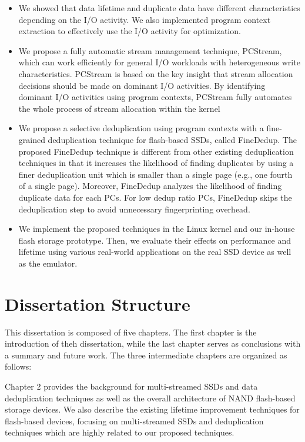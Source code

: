 \begin{itemize}
\item 
We showed that data lifetime and duplicate data have different characteristics depending on the I/O activity.
We also implemented program context extraction to effectively use the I/O activity for optimization.

\item 
We propose a fully automatic stream management
technique, PCStream, which can work efficiently for general
I/O workloads with heterogeneous write characteristics. PCStream
is based on the key insight that stream allocation decisions
should be made on dominant I/O activities. By identifying
dominant I/O activities using program contexts, PCStream
fully automates the whole process of stream allocation
within the kernel 

\item
We propose a selective deduplication using program contexts
with a fine-grained deduplication technique for flash-based SSDs, called \textsf{\small FineDedup}.
The proposed FineDedup technique is different from other existing deduplication techniques
in that it increases the likelihood of finding duplicates
by using a finer deduplication unit
which is smaller than a single page (e.g., one fourth of a single page).
Moreover, FineDedup analyzes the likelihood of finding duplicate data for each PCs.
For low dedup ratio PCs, FineDedup skips the deduplication step to avoid unnecessary 
fingerprinting overhead.

\item
We implement the proposed techniques in the Linux kernel and our in-house flash storage
prototype. Then, we evaluate their effects on performance and lifetime using 
various real-world applications on the real SSD device as well as the emulator.
 
\end{itemize}

\section{Dissertation Structure}
This dissertation is composed of five chapters. The first chapter is the introduction
of theh dissertation, while the last chapter serves as conclusions with a summary
and future work. The three intermediate chapters are organized as follows:

Chapter 2 provides the background for multi-streamed SSDs and data deduplication
techniques as well as the overall architecture of NAND flash-based storage devices.
We also describe the existing lifetime improvement techniques for flash-based devices,
focusing on multi-streamed SSDs and deduplication techniques which are highly related
to our proposed techniques.

